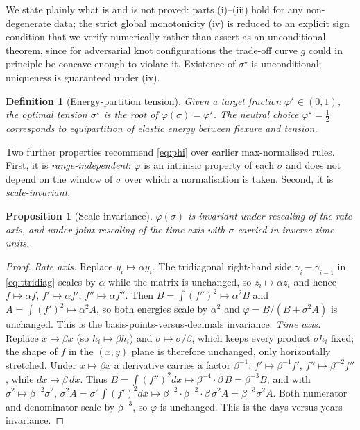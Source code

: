 \documentclass[]{interact}
\theoremstyle{plain}
\newtheorem{proposition}{Proposition}
\newtheorem{definition}{Definition}
\begin{document}
We state plainly what is and is not proved: parts (i)--(iii) hold for any non-degenerate data;
the strict global monotonicity (iv) is reduced to an explicit sign condition that we verify
numerically rather than assert as an unconditional theorem, since for adversarial knot
configurations the trade-off curve $g$ could in principle be concave enough to violate it.
Existence of $\sigma^\star$ is unconditional; uniqueness is guaranteed under (iv).

\begin{definition}[Energy-partition tension]
Given a target fraction $\varphi^\star\in(0,1)$, the optimal tension $\sigma^\star$ is the
root of $\varphi(\sigma)=\varphi^\star$. The neutral choice $\varphi^\star=\tfrac12$
corresponds to \emph{equipartition} of elastic energy between flexure and tension.
\end{definition}

Two further properties recommend \eqref{eq:phi} over earlier max-normalised rules. First, it is
\emph{range-independent}: $\varphi$ is an intrinsic property of each $\sigma$ and does not
depend on the window of $\sigma$ over which a normalisation is taken. Second, it is
\emph{scale-invariant}.

\begin{proposition}[Scale invariance]\label{prop:inv}
$\varphi(\sigma)$ is invariant under rescaling of the rate axis, and under joint rescaling of
the time axis with $\sigma$ carried in inverse-time units.
\end{proposition}
\begin{proof}
\emph{Rate axis.} Replace $y_i\mapsto\alpha y_i$. The tridiagonal right-hand side
$\gamma_i-\gamma_{i-1}$ in \eqref{eq:ttridiag} scales by $\alpha$ while the matrix is unchanged,
so $z_i\mapsto\alpha z_i$ and hence $f\mapsto\alpha f$, $f'\mapsto\alpha f'$, $f''\mapsto\alpha f''$.
Then $B=\int(f'')^2\mapsto\alpha^2 B$ and $A=\int(f')^2\mapsto\alpha^2 A$, so both energies scale
by $\alpha^2$ and $\varphi=B/(B+\sigma^2A)$ is unchanged. This is the basis-points-versus-decimals
invariance.
\emph{Time axis.} Replace $x\mapsto\beta x$ (so $h_i\mapsto\beta h_i$) and $\sigma\mapsto\sigma/\beta$,
which keeps every product $\sigma h_i$ fixed; the shape of $f$ in the $(x,y)$ plane is therefore
unchanged, only horizontally stretched. Under $x\mapsto\beta x$ a derivative carries a factor
$\beta^{-1}$: $f'\mapsto\beta^{-1}f'$, $f''\mapsto\beta^{-2}f''$, while $dx\mapsto\beta\,dx$. Thus
$B=\int(f'')^2dx\mapsto\beta^{-4}\cdot\beta\,B=\beta^{-3}B$, and with $\sigma^2\mapsto\beta^{-2}\sigma^2$,
$\sigma^2 A=\sigma^2\!\int(f')^2dx\mapsto\beta^{-2}\cdot\beta^{-2}\cdot\beta\,\sigma^2A=\beta^{-3}\sigma^2A$.
Both numerator and denominator scale by $\beta^{-3}$, so $\varphi$ is unchanged. This is the
days-versus-years invariance.
\end{proof}
\end{document}
